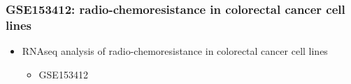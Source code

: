\documentclass[
]{article}
\providecommand{\tightlist}{%
  \setlength{\itemsep}{0pt}\setlength{\parskip}{0pt}}
\begin{document}
\hypertarget{gse153412-radio-chemoresistance-in-colorectal-cancer-cell-lines}{%
\subsubsection{GSE153412: radio-chemoresistance in colorectal cancer cell lines}\label{gse153412-radio-chemoresistance-in-colorectal-cancer-cell-lines}}

\begin{itemize}
\tightlist
\item
  RNAseq analysis of radio-chemoresistance in colorectal cancer cell lines

  \begin{itemize}
  \tightlist
  \item
    GSE153412
  \end{itemize}
\end{itemize}
\end{document}
